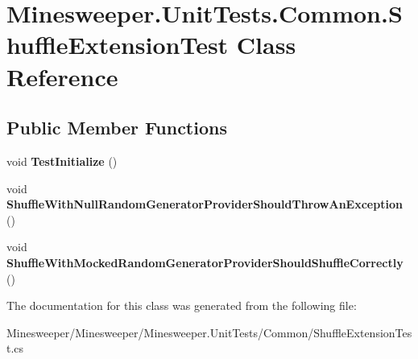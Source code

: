 \hypertarget{class_minesweeper_1_1_unit_tests_1_1_common_1_1_shuffle_extension_test}{\section{Minesweeper.\+Unit\+Tests.\+Common.\+Shuffle\+Extension\+Test Class Reference}
\label{class_minesweeper_1_1_unit_tests_1_1_common_1_1_shuffle_extension_test}
}
\subsection*{Public Member Functions}
\begin{DoxyCompactItemize}
\item 
\hypertarget{class_minesweeper_1_1_unit_tests_1_1_common_1_1_shuffle_extension_test_a32a9cb1c4d9cff70ab62c80253cf0c51}{void {\bfseries Test\+Initialize} ()}\label{class_minesweeper_1_1_unit_tests_1_1_common_1_1_shuffle_extension_test_a32a9cb1c4d9cff70ab62c80253cf0c51}

\item 
\hypertarget{class_minesweeper_1_1_unit_tests_1_1_common_1_1_shuffle_extension_test_aabf781a5bba8bf96739784a4a627089b}{void {\bfseries Shuffle\+With\+Null\+Random\+Generator\+Provider\+Should\+Throw\+An\+Exception} ()}\label{class_minesweeper_1_1_unit_tests_1_1_common_1_1_shuffle_extension_test_aabf781a5bba8bf96739784a4a627089b}

\item 
\hypertarget{class_minesweeper_1_1_unit_tests_1_1_common_1_1_shuffle_extension_test_ac54dc487b1443c5d008a7b286bcec350}{void {\bfseries Shuffle\+With\+Mocked\+Random\+Generator\+Provider\+Should\+Shuffle\+Correctly} ()}\label{class_minesweeper_1_1_unit_tests_1_1_common_1_1_shuffle_extension_test_ac54dc487b1443c5d008a7b286bcec350}

\end{DoxyCompactItemize}


The documentation for this class was generated from the following file\+:\begin{DoxyCompactItemize}
\item 
Minesweeper/\+Minesweeper/\+Minesweeper.\+Unit\+Tests/\+Common/Shuffle\+Extension\+Test.\+cs\end{DoxyCompactItemize}
